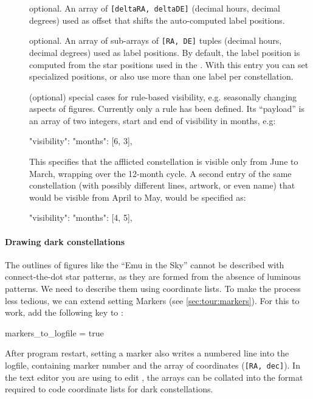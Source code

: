 \begin{description}
\item[] optional. An array of \texttt{[deltaRA, deltaDE]} (decimal hours, decimal degrees) 
                            used as offset that shifts the auto-computed label positions. 

\item[] optional. An array of sub-arrays of \texttt{[RA, DE]} tuples (decimal hours, decimal degrees) used as label positions. 
                               By default, the label position is computed from the star positions used in the . 
			                   With this entry you can set specialized positions, or also use more than one label per constellation. 
\item[] (optional) special cases for rule-based visibility, e.g. seasonally changing aspects of figures. 
	Currently only a  rule has been defined. 
	Its ``payload'' is an array of two integers, start and end of visibility in months, e.g:

	\begin{jsonfile}
"visibility": {"months": [6, 3]},
	\end{jsonfile}
%
This specifies that the afflicted constellation is visible only from June to March, wrapping over the 12-month cycle. 
A second entry of the same constellation (with possibly different lines, artwork, or even name) 
that would be visible from April to May, would be specified as:
\begin{jsonfile}
"visibility": {"months": [4, 5]},
\end{jsonfile}
\end{description}


\paragraph{Drawing dark constellations}
The outlines of figures like the ``Emu in the Sky'' cannot be described with connect-the-dot star patterns, 
as they are formed from the absence of luminous patterns. We need to describe them using coordinate lists. 
To make the process less tedious, we can extend setting Markers (see \ref{sec:tour:markers}). 
For this to work, add the following key to :
\begin{configfile}
[devel]
markers_to_logfile = true
\end{configfile}
After program restart, setting a marker also writes a numbered line into the logfile, 
containing marker number and the array of coordinates (\texttt{[RA, dec]}). 
In the text editor you are using to edit , 
the arrays can be collated into the format required to code coordinate lists for dark constellations.

